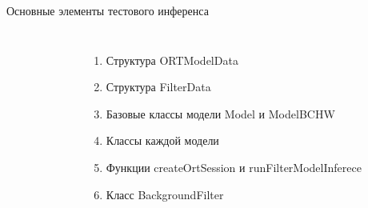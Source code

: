\documentclass[aspectratio=169,xcolor=dvipsnames]{beamer}
\begin{document}
\begin{frame}{Основные элементы тестового инференса}
    \begin{columns}[c] %

        \begin{figure}[h]
            \label{ris:ORTModelData}
        \end{figure}

        \begin{enumerate}
            \item Структура ORTModelData
            \item Структура FilterData
            \item Базовые классы модели Model и ModelBCHW
            \item Классы каждой модели 
            \item Функции createOrtSession и runFilterModelInferece
            \item Класс BackgroundFilter
        \end{enumerate}

    \end{columns}
\end{frame}

\end{document}
